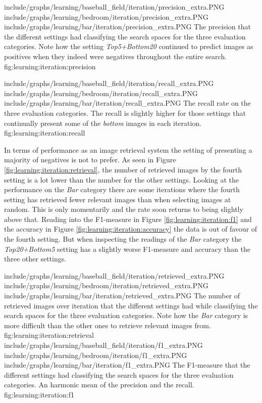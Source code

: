 \tripfigurenear
{include/graphs/learning/baseball_field/iteration/precision_extra.PNG}
{include/graphs/learning/bedroom/iteration/precision_extra.PNG}
{include/graphs/learning/bar/iteration/precision_extra.PNG}
{The precision that the different settings had classifying the search spaces for the three evaluation categories. Note how the setting \emph{Top5+Bottom20} continued to predict images as positives when they indeed were negatives throughout the entire search.}
{fig:learning:iteration:precision}

\tripfigurenear
{include/graphs/learning/baseball_field/iteration/recall_extra.PNG}
{include/graphs/learning/bedroom/iteration/recall_extra.PNG}
{include/graphs/learning/bar/iteration/recall_extra.PNG}
{The recall rate on the three evaluation categories. The recall is slightly higher for those settings that continually present some of the \emph{bottom} images in each iteration.}
{fig:learning:iteration:recall}

In terms of performance as an image retrieval system the setting of presenting a majority of negatives is not to prefer. As seen in Figure \ref{fig:learning:iteration:retrieval}, the number of retrieved images by the fourth setting is a lot lower than the number for the other settings. Looking at the performance on the \emph{Bar} category there are some iterations where the fourth setting has retrieved fewer relevant images than when selecting images at random. This is only momentarily and the rate soon returns to being slightly above that. Reading into the F1-measure in Figure \ref{fig:learning:iteration:f1} and the accuracy in Figure \ref{fig:learning:iteration:accuracy} the data is out of favour of the fourth setting. But when inspecting the readings of the \emph{Bar} category the \emph{Top20+Bottom5} setting has a slightly worse F1-measure and accuracy than the three other settings. 

\tripfigurenear
{include/graphs/learning/baseball_field/iteration/retrieved_extra.PNG}
{include/graphs/learning/bedroom/iteration/retrieved_extra.PNG}
{include/graphs/learning/bar/iteration/retrieved_extra.PNG}
{The number of retrieved images over iteration that the different settings had while classifying the search spaces for the three evaluation categories. Note how the \emph{Bar} category is more difficult than the other ones to retrieve relevant images from.}
{fig:learning:iteration:retrieval}
\tripfigurenear
{include/graphs/learning/baseball_field/iteration/f1_extra.PNG}
{include/graphs/learning/bedroom/iteration/f1_extra.PNG}
{include/graphs/learning/bar/iteration/f1_extra.PNG}
{The F1-measure that the different settings had classifying the search spaces for the three evaluation categories. An harmonic mean of the precision and the recall.}
{fig:learning:iteration:f1}


